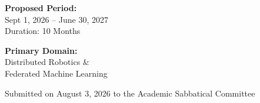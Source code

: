 \par\vspace{1.5em}

\noindent
\begin{minipage}[t]{0.48\textwidth}
    \begin{tcolorbox}[colback=lightbg, colframe=darkgray, title={\faCalendar\quad Sabbatical Details}, fonttitle=\bfseries\sffamily]
        \textbf{Proposed Period:}\\
        Sept 1, 2026 -- June 30, 2027\\
        Duration: 10 Months
    \end{tcolorbox}
\end{minipage}\hfill
\begin{minipage}[t]{0.48\textwidth}
    \begin{tcolorbox}[colback=lightbg, colframe=accentcolor, title={\faGraduationCap\quad Research Area}, fonttitle=\bfseries\sffamily]
        \textbf{Primary Domain:}\\
        Distributed Robotics \&\\
        Federated Machine Learning
    \end{tcolorbox}
\end{minipage}

\vspace{2.5cm}
\begin{center}
    \sffamily\color{darkgray}
    Submitted on August 3, 2026 to the Academic Sabbatical Committee
\end{center}
